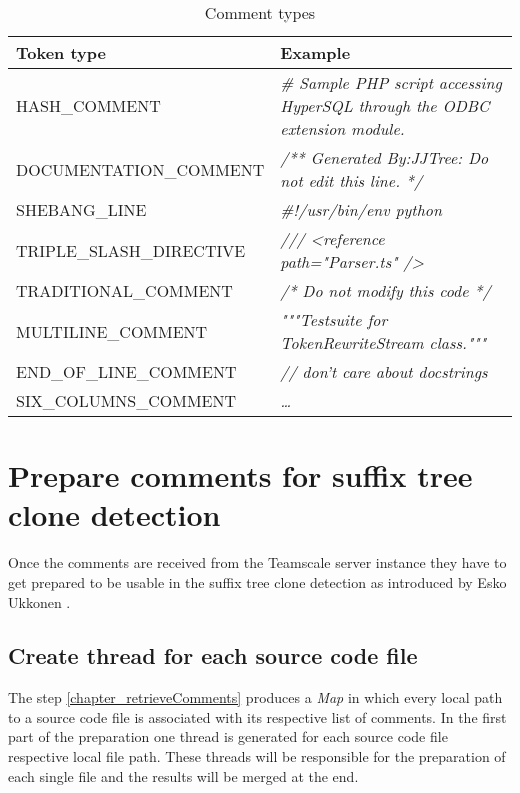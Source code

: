 \begin{table}[H]
	\caption{Comment types}
	\label{table_commentTypes}
	\begin{tabularx}{\textwidth}{l|L}
		\textbf{Token type} & \textbf{Example} \\
		\hline
		HASH\_COMMENT & \textit{\# Sample PHP script accessing HyperSQL through the ODBC extension module.}\\ 
		DOCUMENTATION\_COMMENT & \textit{/** Generated By:JJTree: Do not edit this line. */} \\ 
		SHEBANG\_LINE & \textit{\#!/usr/bin/env python } \\ 
		TRIPLE\_SLASH\_DIRECTIVE & \textit{/// <reference path="Parser.ts" />} \\ 
		TRADITIONAL\_COMMENT & \textit{/* Do not modify this code */} \\ 
		MULTILINE\_COMMENT & \textit{"""Testsuite for TokenRewriteStream class."""} \\ 
		END\_OF\_LINE\_COMMENT & \textit{// don't care about docstrings} \\ 
		SIX\_COLUMNS\_COMMENT & \textit{\dots} \\ 
	\end{tabularx} 
\end{table}


\section{Prepare comments for suffix tree clone detection}
Once the comments are received from the Teamscale server instance they have to get prepared to be usable in the suffix tree clone detection as introduced by Esko Ukkonen \cite{Ukkonen1995}\cite{Ukkonen1993}.\\
\subsection{Create thread for each source code file}
The step \ref{chapter_retrieveComments} produces a \textit{Map} in which every local path to a source code file is associated with its respective list of comments.
In the first part of the preparation one thread is generated for each source code file respective local file path. These threads will be responsible for the preparation of each single file and the results will be merged at the end.
